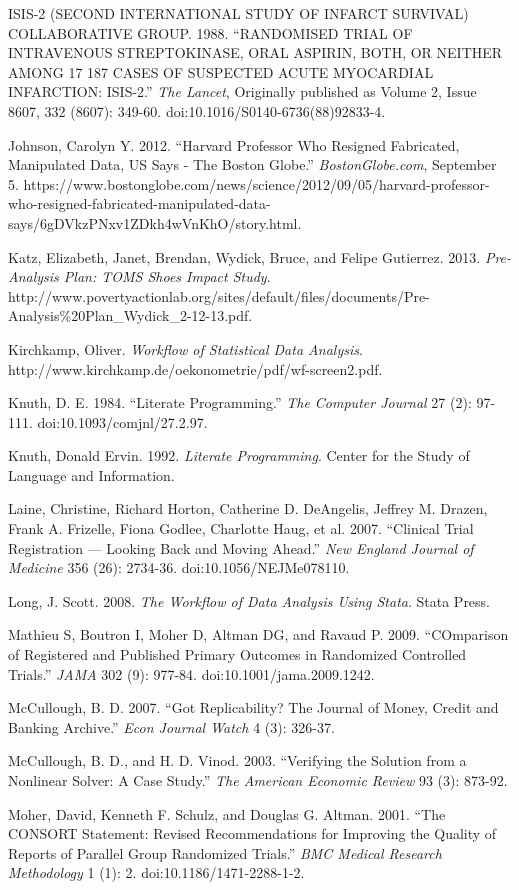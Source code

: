 \documentclass[12pt] {article}
\begin{document}
ISIS-2 (SECOND INTERNATIONAL STUDY OF INFARCT SURVIVAL) COLLABORATIVE
GROUP. 1988. ``RANDOMISED TRIAL OF INTRAVENOUS STREPTOKINASE, ORAL
ASPIRIN, BOTH, OR NEITHER AMONG 17 187 CASES OF SUSPECTED ACUTE
MYOCARDIAL INFARCTION: ISIS-2.'' \emph{The Lancet}, Originally published
as Volume 2, Issue 8607, 332 (8607): 349-60.
doi:10.1016/S0140-6736(88)92833-4.

Johnson, Carolyn Y. 2012. ``Harvard Professor Who Resigned Fabricated,
Manipulated Data, US Says - The Boston Globe.'' \emph{BostonGlobe.com},
September 5.
https://www.bostonglobe.com/news/science/2012/09/05/harvard-professor-who-resigned-fabricated-manipulated-data-says/6gDVkzPNxv1ZDkh4wVnKhO/story.html.

Katz, Elizabeth, Janet, Brendan, Wydick, Bruce, and Felipe Gutierrez.
2013. \emph{Pre-Analysis Plan: TOMS Shoes Impact Study}.
http://www.povertyactionlab.org/sites/default/files/documents/Pre-Analysis\%20Plan\_Wydick\_2-12-13.pdf.

Kirchkamp, Oliver. \emph{Workflow of Statistical Data Analysis}.
http://www.kirchkamp.de/oekonometrie/pdf/wf-screen2.pdf.

Knuth, D. E. 1984. ``Literate Programming.'' \emph{The Computer Journal}
27 (2): 97-111. doi:10.1093/comjnl/27.2.97.

Knuth, Donald Ervin. 1992. \emph{Literate Programming}. Center for the
Study of Language and Information.

Laine, Christine, Richard Horton, Catherine D. DeAngelis, Jeffrey M.
Drazen, Frank A. Frizelle, Fiona Godlee, Charlotte Haug, et al. 2007.
``Clinical Trial Registration --- Looking Back and Moving Ahead.''
\emph{New England Journal of Medicine} 356 (26): 2734-36.
doi:10.1056/NEJMe078110.

Long, J. Scott. 2008. \emph{The Workflow of Data Analysis Using Stata}.
Stata Press.

Mathieu S, Boutron I, Moher D, Altman DG, and Ravaud P. 2009.
``COmparison of Registered and Published Primary Outcomes in Randomized
Controlled Trials.'' \emph{JAMA} 302 (9): 977-84.
doi:10.1001/jama.2009.1242.

McCullough, B. D. 2007. ``Got Replicability? The Journal of Money,
Credit and Banking Archive.'' \emph{Econ Journal Watch} 4 (3): 326-37.

McCullough, B. D., and H. D. Vinod. 2003. ``Verifying the Solution from
a Nonlinear Solver: A Case Study.'' \emph{The American Economic Review}
93 (3): 873-92.

Moher, David, Kenneth F. Schulz, and Douglas G. Altman. 2001. ``The
CONSORT Statement: Revised Recommendations for Improving the Quality of
Reports of Parallel Group Randomized Trials.'' \emph{BMC Medical
Research Methodology} 1 (1): 2. doi:10.1186/1471-2288-1-2.
\end{document}
